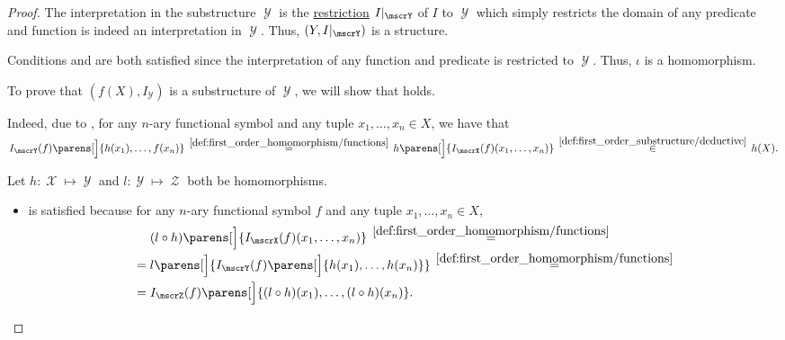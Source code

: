 \begin{proof}
   The interpretation in the substructure \( \mscrY \) is the \hyperref[def:multi_valued_function/restriction]{restriction} \( I\restr_\mscrY \) of \( I \) to \( \mscrY \) which simply restricts the domain of any predicate and function is indeed an interpretation in \( \mscrY \). Thus, \( (Y, I\restr_\mscrY) \) is a structure.

  Conditions  and  are both satisfied since the interpretation of any function and predicate is restricted to \( \mscrY \). Thus, \( \iota \) is a homomorphism.

   To prove that \( (f(X), I_\mscrY) \) is a substructure of \( \mscrY \), we will show that  holds.

  Indeed, due to , for any \( n \)-ary functional symbol and any tuple \( {x_1, \ldots, x_n \in X} \), we have that
  \begin{equation*}
    I_\mscrY(f) \parens[\Big]{ h(x_1), \ldots, f(x_n) }
    \reloset {\ref{def:first_order_homomorphism/functions}} =
    h\parens[\Big]{ I_\mscrX(f)(x_1, \ldots, x_n) }
    \reloset {\ref{def:first_order_substructure/deductive}} \in
    h(X).
  \end{equation*}

   Let \( h: \mscrX \mapsto \mscrY \) and \( l: \mscrY \mapsto \mscrZ \) both be homomorphisms.

  \begin{itemize}
    \item {} is satisfied because for any \( n \)-ary functional symbol \( f \) and any tuple \( x_1, \ldots, x_n \in X \),
    \begin{align*}
      &\phantom{{}={}}
      (l \bincirc h) \parens[\Big]{ I_\mscrX(f)(x_1, \ldots, x_n) }
      \reloset {\ref{def:first_order_homomorphism/functions}} = \\ &=
      l\parens[\Big]{ I_\mscrY(f) \parens[\Big]{ h(x_1), \ldots, h(x_n) } }
      \reloset {\ref{def:first_order_homomorphism/functions}} = \\ &=
      I_{\mscrZ}(f) \parens[\Big]{ (l \bincirc h)(x_1), \ldots, (l \bincirc h)(x_n) }.
    \end{align*}


\end{itemize}
\end{proof}

